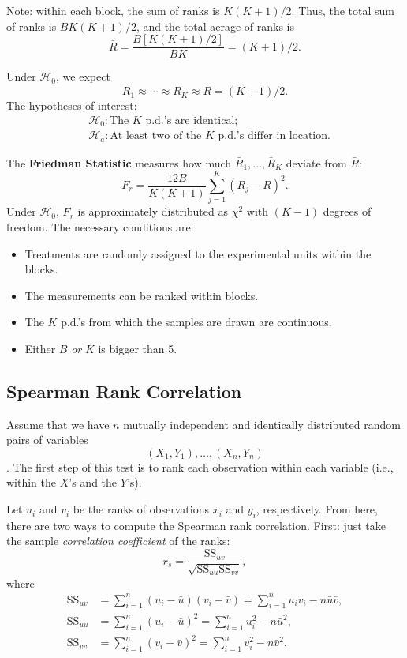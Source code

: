 \documentclass[12pt]{article}
\begin{document}
Note: within each block, the sum of ranks is $K(K+1)/2$. Thus, the total sum of ranks is $BK(K+1)/2$, and the total aerage of ranks is \[\bar{R} = \frac{B[K(K+1)/2]}{BK} = (K+1)/2.\]

Under $\mathcal{H}_0$, we expect \[\bar{R}_1 \approx \cdots \approx \bar{R}_K \approx \bar{R} = (K+1)/2.\] The hypotheses of interest:
\begin{align*}
    &\mathcal{H}_0: \text{The } K \text{ p.d.'s are identical;}\\
    &\mathcal{H}_a: \text{At least two of the } K \text{ p.d.'s differ in location.}
\end{align*}

The \textbf{Friedman Statistic} measures how much $\bar{R}_1, \dots, \bar{R}_K$ deviate from $\bar{R}$: \[F_r = \frac{12B}{K(K+1)} \sum_{j=1}^K (\bar{R}_j - \bar{R})^2.\] Under $\mathcal{H}_0$, $F_r$ is approximately distributed as $\chi^2$ with $(K-1)$ degrees of freedom. The necessary conditions are: \begin{itemize}
    \item Treatments are randomly assigned to the experimental units within the blocks.
    \item The measurements can be ranked within blocks.
    \item The $K$ p.d.'s from which the samples are drawn are continuous.
    \item Either $B$ \textit{or} $K$ is bigger than 5.
\end{itemize}

\subsection{Spearman Rank Correlation}

Assume that we have $n$ mutually independent and identically distributed random pairs of variables \[(X_1, Y_1), \dots, (X_n, Y_n)\]. The first step of this test is to rank each observation within each variable (i.e., within the $X$'s and the $Y$'s).

Let $u_i$ and $v_i$ be the ranks of observations $x_i$ and $y_i$, respectively. From here, there are two ways to compute the Spearman rank correlation. First: just take the sample \textit{correlation coefficient} of the ranks: \[r_s = \frac{\text{SS}_{uv}}{\sqrt{\text{SS}_{uu}\text{SS}_{vv}}},\] where \begin{align*}
    \text{SS}_{uv} &= \sum_{i=1}^n (u_i - \bar{u})(v_i - \bar{v}) = \sum_{i=1}^n u_iv_i-n\bar{u}\bar{v},\\
    \text{SS}_{uu} &= \sum_{i=1}^n (u_i - \bar{u})^2 = \sum_{i=1}^n u_i^2 - n\bar{u}^2,\\
    \text{SS}_{vv} &= \sum_{i=1}^n (v_i - \bar{v})^2 = \sum_{i=1}^n v_i^2 - n\bar{v}^2.
\end{align*}
\end{document}
